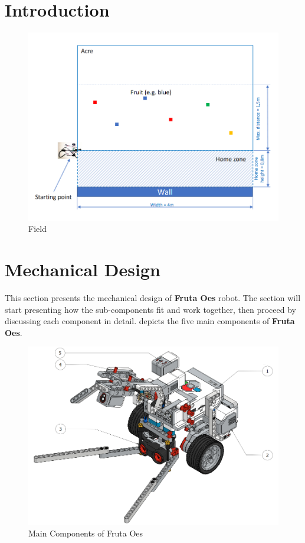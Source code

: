 

\section{Introduction}\label{sec:introduction}

\begin{figure}[!ht]
	\centering
	\includegraphics[width=0.8\linewidth]{Graphics/acre}
	\caption{Field \cite{mm}}
	\label{fig:field}
\end{figure}

\newpage
\section{Mechanical Design}\label{sec:mechanicalDesign}

\noindent This section presents the mechanical design of \textbf{Fruta Oes} robot. The section will start presenting how the sub-components fit and work together, then proceed by discussing each component in detail.  depicts the five main components of \textbf{Fruta Oes}.
\begin{figure}[!ht]
	\centering
	\includegraphics[width=0.8\linewidth]{Graphics/LabelledFruta}
	\caption{Main Components of Fruta Oes}
	\label{fig:labelledfruta}
\end{figure}


